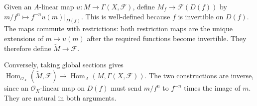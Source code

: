 Given an $A$-linear map $u:M\to\Gamma(X,\mathcal F)$, define $M_f\to\mathcal F(D(f))$ by $m/f^n\mapsto f^{-n}u(m)|_{D(f)}$. This is well-defined because $f$ is invertible on $D(f)$. The maps commute with restrictions: both restriction maps are the unique extensions of $m\mapsto u(m)$ after the required functions become invertible. They therefore define $\widetilde M\to\mathcal F$.

Conversely, taking global sections gives $\operatorname{Hom}_{\mathcal O_X}(\widetilde M,\mathcal F)\to\operatorname{Hom}_A(M,\Gamma(X,\mathcal F))$. The two constructions are inverse, since an $\mathcal O_X$-linear map on $D(f)$ must send $m/f^n$ to $f^{-n}$ times the image of $m$. They are natural in both arguments.
